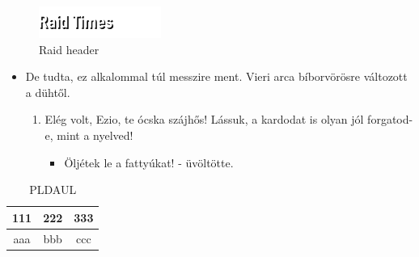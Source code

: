 \documentclass[12pt,a4paper,twoside]{report}
\theoremstyle{definition}
\begin{document}
\begin{figure}[th!]
    \centering
    \includegraphics[width=4cm]{raid.png}
    \caption{Raid header}
    \label{abra-raid}
\end{figure}
\begin{itemize}
    \item De  tudta, ez alkalommal túl messzire  ment. Vieri arca bíborvörösre változott a dühtől. 
    \begin{enumerate}
        \item Elég volt, Ezio, te ócska szájhős! Lássuk, a kardodat is olyan jól 
        forgatod-e, mint a nyelved!
        \begin{itemize}
            \item Öljétek le a fattyúkat! - üvöltötte.
        \end{itemize}
    \end{enumerate}
\end{itemize}

\begin{table}[th!]
    \centering
    \begin{tabular}{c|c|c}
        \hline
        111&222&333\\
        \hline
        aaa&bbb&ccc\\
        \hline
    \end{tabular}
    \caption{PLDAUL}
    \label{tablazatom}
\end{table}
\end{document}

